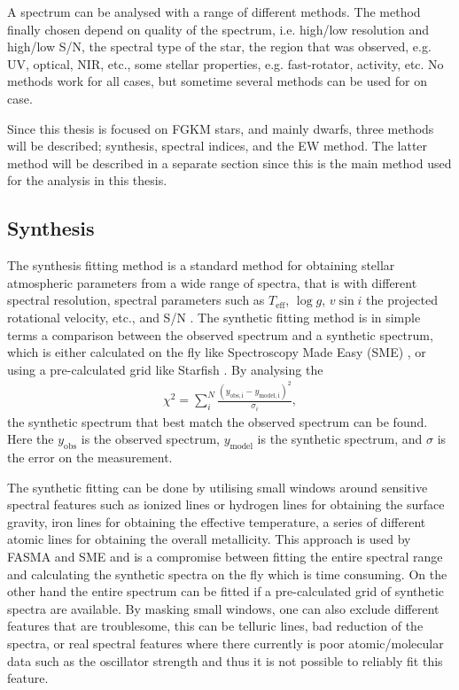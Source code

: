 A spectrum can be analysed with a range of different methods. The method finally
chosen depend on quality of the spectrum, i.e. high/low resolution and high/low
S/N, the spectral type of the star, the region that was observed, e.g. UV,
optical, NIR, etc., some stellar properties, e.g. fast-rotator, activity, etc.
No methods work for all cases, but sometime several methods can be used for on
case.

Since this thesis is focused on FGKM stars, and mainly dwarfs, three methods
will be described; synthesis, spectral indices, and the EW method. The latter
method will be described in a separate section since this is the main method
used for the analysis in this thesis.



\subsection{Synthesis}
\label{sec:synthesis}

The synthesis fitting method is a standard method for obtaining stellar
atmospheric parameters from a wide range of spectra, that is with different
spectral resolution, spectral parameters such as $T_\mathrm{eff}$, $\log g$,
$v\sin i$ the projected rotational velocity, etc., and S/N  \citep[see
e.g.][]{Tsantaki2017}. The synthetic fitting method is in simple terms a
comparison between the observed spectrum and a synthetic spectrum, which is
either calculated on the fly like Spectroscopy Made Easy (SME)
\citep{Valenti1996}, or using a pre-calculated grid like Starfish
\citep{Czekala2015}. By analysing the
\begin{align}
  \chi^2 = \sum_i^N\frac{(y_\mathrm{obs,i}-y_\mathrm{model,i})^2}{\sigma_i},
\end{align}
the synthetic spectrum that best match the observed spectrum can be found. Here
the $y_\mathrm{obs}$ is the observed spectrum, $y_\mathrm{model}$ is the
synthetic spectrum, and $\sigma$ is the error on the measurement.

The synthetic fitting can be done by utilising small windows around sensitive
spectral features such as ionized lines or hydrogen lines for obtaining the
surface gravity, iron lines for obtaining the effective temperature, a series of
different atomic lines for obtaining the overall metallicity. This approach is
used by FASMA and SME \citep[][respectively]{Valenti1996,Tsantaki2017} and is a
compromise between fitting the entire spectral range and calculating the
synthetic spectra on the fly which is time consuming. On the other hand the
entire spectrum can be fitted if a pre-calculated grid of synthetic spectra are
available. By masking small windows, one can also exclude different features
that are troublesome, this can be telluric lines, bad reduction of the spectra,
or real spectral features where there currently is poor atomic/molecular data
such as the oscillator strength and thus it is not possible to reliably fit this
feature.

